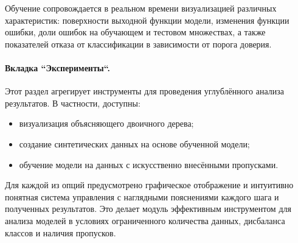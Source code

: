 Обучение сопровождается в реальном времени визуализацией различных характеристик: поверхности выходной функции модели, изменения функции ошибки, доли ошибок на обучающем и тестовом множествах, а также показателей отказа от классификации в зависимости от порога доверия.

\paragraph{Вкладка ``Эксперименты``.} Этот раздел агрегирует инструменты для проведения углублённого анализа результатов. В частности, доступны:
\begin{itemize}
    \item визуализация объясняющего двоичного дерева;
    \item создание синтетических данных на основе обученной модели;
    \item обучение модели на данных с искусственно внесёнными пропусками.
\end{itemize}

Для каждой из опций предусмотрено графическое отображение и интуитивно понятная система управления с наглядными пояснениями каждого шага и полученных результатов. Это делает модуль эффективным инструментом для анализа моделей в условиях ограниченного количества данных, дисбаланса классов и наличия пропусков.

